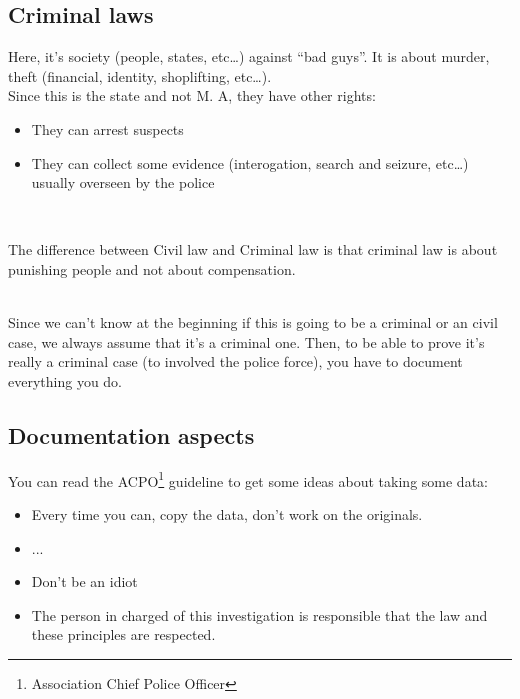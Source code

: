 \subsection{Criminal laws}
Here, it's society (people, states, etc\ldots) against \enquote{bad guys}. It is about murder, theft (financial, identity, shoplifting, etc\ldots).\\
Since this is the state and not M. A, they have other rights:
\begin{itemize}
 \item They can arrest suspects
 \item They can collect some evidence (interogation, search and seizure, etc\ldots) usually overseen by the police
\end{itemize}
~\\\par
The difference between Civil law and Criminal law is that criminal law is about punishing people and not about compensation.\\
~\\\par
Since we can't know at the beginning if this is going to be a criminal or an civil case, we always assume that it's a criminal one. Then, to be able to prove it's really a criminal case (to involved the police force), you have to document everything you do.
\subsection{Documentation aspects}
You can read the ACPO\footnote{Association Chief Police Officer} guideline to get some ideas about taking some data:
\begin{itemize}
 \item Every time you can, copy the data, don't work on the originals.
 \item ...
 \item Don't be an idiot
 \item The person in charged of this investigation is responsible that the law and these principles are respected.
\end{itemize}